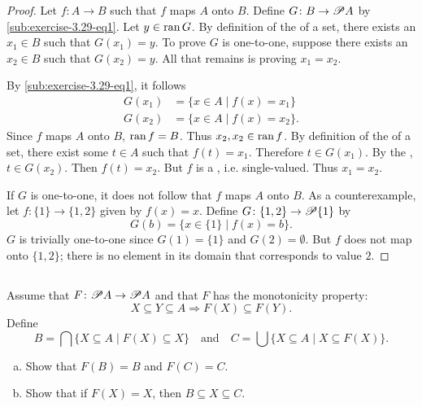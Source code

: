 \documentclass{report}
\begin{document}
\begin{proof}

  Let $f \colon A \rightarrow B$ such that $f$ maps $A$ onto $B$.
  Define $G \colon B \rightarrow \mathscr{P}A$ by
    \eqref{sub:exercise-3.29-eq1}.
  Let $y \in \mathop{\text{ran}}{G}$.
  By definition of the  of a set, there exists an
    $x_1 \in B$ such that $G(x_1) = y$.
  To prove $G$ is one-to-one, suppose there exists an $x_2 \in B$ such
    that $G(x_2) = y$.
  All that remains is proving $x_1 = x_2$.

  By \eqref{sub:exercise-3.29-eq1}, it follows
    \begin{align*}
      G(x_1) & = \{x \in A \mid f(x) = x_1\} \\
      G(x_2) & = \{x \in A \mid f(x) = x_2\}.
    \end{align*}
  Since $f$ maps $A$ onto $B$, $\mathop{\text{ran}}{f} = B$.
  Thus $x_2, x_2 \in \mathop{\text{ran}}{f}$.
  By definition of the  of a set, there exist some $t \in A$
    such that $f(t) = x_1$.
  Therefore $t \in G(x_1)$.
  By the , $t \in G(x_2)$.
  Then $f(t) = x_2$.
  But $f$ is a , i.e. single-valued.
  Thus $x_1 = x_2$.

  \suitdivider
  If $G$ is one-to-one, it does not follow that $f$ maps $A$ onto $B$.
  As a counterexample, let $f \colon \{1\} \rightarrow \{1, 2\}$ given by
    $f(x) = x$.
  Define $G \colon \{1, 2\} \rightarrow \mathscr{P}\{1\}$ by
    $$G(b) = \{x \in \{1\} \mid f(x) = b\}.$$
  $G$ is trivially one-to-one since $G(1) = \{1\}$ and $G(2) = \emptyset$.
  But $f$ does not map onto $\{1, 2\}$; there is no element in its domain that
    corresponds to value $2$.

\end{proof}

\subsection{}%
\label{sub:exercise-3.30}

Assume that $F \colon \mathscr{P}A \rightarrow \mathscr{P}A$ and that $F$ has
  the monotonicity property:
  $$X \subseteq Y \subseteq A \Rightarrow F(X) \subseteq F(Y).$$
Define
  $$B = \bigcap\{X \subseteq A \mid F(X) \subseteq X\} \quad\text{and}\quad
    C = \bigcup\{X \subseteq A \mid X \subseteq F(X)\}.$$
\begin{enumerate}[(a)]
  \item Show that $F(B) = B$ and $F(C) = C$.
  \item Show that if $F(X) = X$, then $B \subseteq X \subseteq C$.
\end{enumerate}
\end{document}
